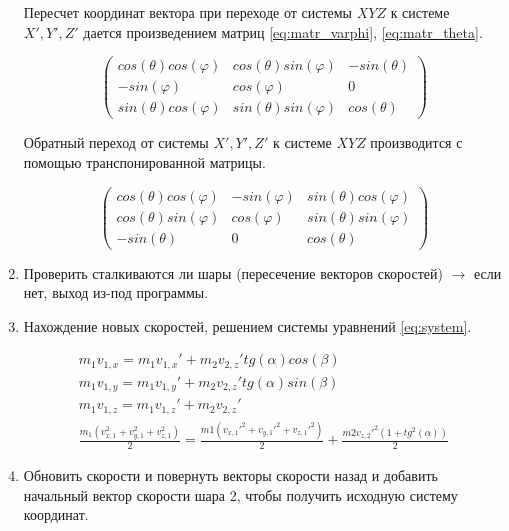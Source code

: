\begin{enumerate}
	Пересчет координат вектора при переходе от системы $XYZ$ к системе $X',Y',Z'$ дается произведением матриц \ref{eq:matr_varphi}, \ref{eq:matr_theta}. 
	
	\begin{equation}
		\begin{pmatrix}
			cos(\theta)cos(\varphi)& cos(\theta)sin(\varphi) & -sin(\theta)\\
			-sin(\varphi)& cos(\varphi) & 0\\
			sin(\theta)cos(\varphi)&sin(\theta)sin(\varphi)&cos(\theta)
		\end{pmatrix}
		\label{eq:matr_rotate}
	\end{equation}
	
	Обратный переход от системы $X',Y',Z'$ к системе $XYZ$ производится с помощью транспонированной матрицы. 
	
	\begin{equation}
		\begin{pmatrix}
			cos(\theta)cos(\varphi)& -sin(\varphi) & sin(\theta)cos(\varphi)\\
			cos(\theta)sin(\varphi)& cos(\varphi) & sin(\theta)sin(\varphi)\\
			-sin(\theta)&0&cos(\theta)
		\end{pmatrix}
		\label{eq:matr_transpose}
	\end{equation}
	
	\item Проверить сталкиваются ли шары (пересечение векторов скоростей) $\to$ если нет, выход из-под программы. 
	\item Нахождение новых скоростей, решением системы уравнений \ref{eq:system}.  
	
	\begin{equation}
		\begin{matrix}
			m_1 v_{1,x} = m_1 v_{1,x}' + m_2 v_{2,z}' tg(\alpha)cos(\beta)\\
			m_1 v_{1,y} = m_1 v_{1,y}' + m_2 v_{2,z}'tg(\alpha)sin(\beta)\\
			m_1 v_{1,z} = m_1 v_{1,z}' + m_2 v_{2,z}'\\
			\frac{m_1(v_{x,1}^2+v_{y,1}^2+v_{z,1}^2) }{2} =  \frac{m1(v_{x,1}'^2+v_{y,1}'^2+v_{z,1}'^2)}{2} + \frac{m2v_{z,2}'^2(1+tg^2(\alpha))}{2} 
		\end{matrix}
		\label{eq:system}
	\end{equation}

	\item Обновить скорости и повернуть векторы скорости назад и добавить начальный вектор скорости шара 2, чтобы получить исходную систему координат. 
	
\end{enumerate}


